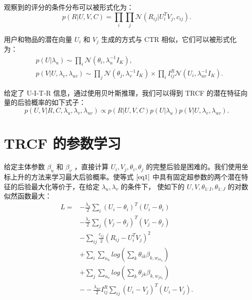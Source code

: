 观察到的评分的条件分布可以被形式化为：
$$
p(R | U, V, C) = \prod\limits_i \prod\limits_j \mathcal{N} (R_{ij}|U_i^T V_j,c_{ij}).
$$

用户和物品的潜在向量 $U_i$ 和 $V_j$ 生成的方式与 CTR 相似，它们可以被形式化为：
\begin{equation}
\begin{aligned}
&p(U|\lambda_u) \sim \prod\limits_i \mathcal{N} (\theta_i, \lambda_u^{-1}I_K), \\
&p(V|U, \lambda_v, \lambda_{uv}) \sim  \prod\limits_j \mathcal{N} (\theta_j, \lambda_v^{-1}I_K)  \times \prod\limits_{i} I_{ij}^R \mathcal{N}(U_i, \lambda_{uv}^{-1}I_K ).
\end{aligned}
\end{equation}

给定了 U-I-T-R 信息，通过使用贝叶斯推理，我们可以得到 TRCF 的潜在特征向量的后验概率的如下式子：
\begin{equation}
p(U,V| R,C,\lambda_u, \lambda_v, \lambda_{uv})  \propto p(R | U, V, C) p(U|\lambda_u) p(V|U, \lambda_v, \lambda_{uv}) .  
\label{eq1}
\tag{1}
\end{equation}


\section{TRCF 的参数学习}

给定主体参数 $\beta_u$ 和 $\beta_v$ ，直接计算 $U_i, V_j, \theta_i, \theta_j$ 的完整后验是困难的。我们使用坐标上升的方法来学习最大后验概率。使等式 $\eqref{eq1}$ 中具有固定超参数的两个潜在特征的后验最大化等价于，在给定 $\lambda_u , \lambda_v$ 的条件下， 使如下的 $U, V, \theta_{1:I}, \theta_{1:J}$ 的对数似然函数最大：
\begin{equation}  
\begin{aligned}
L = & -\frac{\lambda_u}{2} \sum\limits_i{ (U_i - \theta_i)^T  (U_i - \theta_i) }  \\ 
	& -\frac{\lambda_v}{2} \sum\limits_j{ (V_j - \theta_j)^T  (V_j - \theta_j)   } \\
	& -\sum\limits_{ij} \frac{c_{ij}}{2} (R_{ij} - U_i^T V_j)^2 \\
	& +\sum\limits_i \sum\limits_{n_u} log \left(\sum\limits_k \theta_{ik} \beta_{k,w_{in_u}} \right) \\
	& +\sum\limits_j \sum\limits_{n_v} log \left(\sum\limits_k \theta_{jk} \beta_{k,w_{jn_v}} \right) \\
	& - -\frac{\lambda_{uv}}{2} I_{ij}^R \sum\limits_{ij} (U_i - V_j)^T (U_i - V_j).  
\end{aligned} 
\label{eq2}
\tag{2}
\end{equation}

